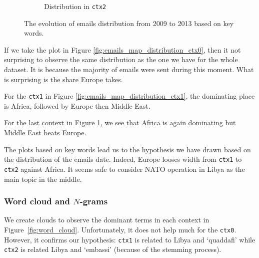 \documentclass[11pt]{article}
\begin{document}
\begin{figure}[!t]
\begin{subfigure}[b]{0.3\linewidth}
		\caption[]%
		{{\small Distribution in \texttt{ctx2}}}
		\label{fig:emails_map_distribution_ctx2}
	\end{subfigure}
	\caption{The evolution of emails distribution from 2009 to 2013 based on key words.}
	\label{fig:map_distribution_evolution}
\end{figure}

If we take the plot in Figure \ref{fig:emails_map_distribution_ctx0}, then it not surprising to observe the same distribution as the one we have for the whole dataset. It is because the majority of emails were sent during this moment. What is surprising is the share Europe takes.

For the \texttt{ctx1} in Figure \ref{fig:emails_map_distribution_ctx1}, the dominating place is Africa, followed by Europe then Middle East.

For the last context in Figure \ref{fig:emails_map_distribution_ctx2}, we see that Africa is again dominating but Middle East beats Europe.

The plots based on key words lead us to the hypothesis we have drawn based on the distribution of the emails date. Indeed, Europe looses width from \texttt{ctx1} to \texttt{ctx2} against Africa. It seems safe to consider NATO operation in Libya as the main topic in the middle.

\subsubsection{Word cloud and $N$-grams}

We create clouds to observe the dominant terms in each context in Figure~\ref{fig:word_cloud}. Unfortunately, it does not help much for the \texttt{ctx0}. However, it confirms our hypothesis: \texttt{ctx1} is related to Libya and `quaddafi' while \texttt{ctx2} is related Libya and `embassi' (because of the stemming process).
\end{document}
